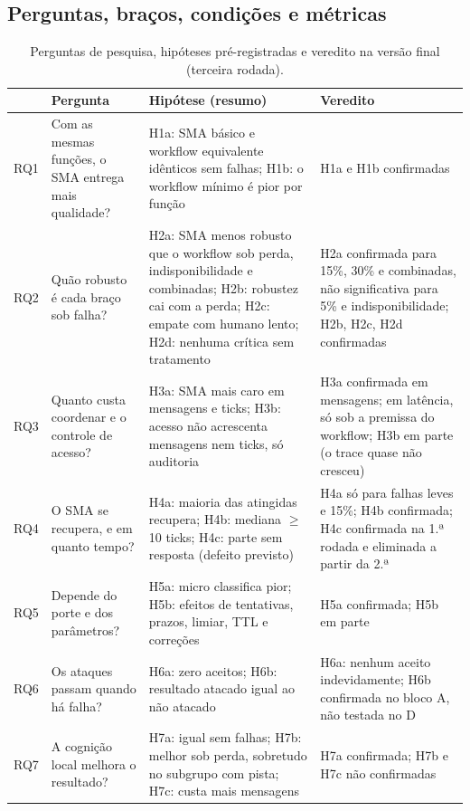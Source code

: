 \documentclass[10pt,a4paper]{article}
\newenvironment{tabela}[1]{\begin{table}[H]\centering\footnotesize\renewcommand{\arraystretch}{1.1}\caption{#1}}{\end{table}}
\begin{document}
\subsection{Perguntas, braços, condições e métricas}
\begin{tabela}{Perguntas de pesquisa, hipóteses pré-registradas e veredito na versão final (terceira rodada).\label{tab:rq}}
\begin{tabularx}{\linewidth}{L{0.7cm} L{4.3cm} Y L{3.4cm}}
\toprule
& \textbf{Pergunta} & \textbf{Hipótese (resumo)} & \textbf{Veredito}\\ \midrule
RQ1 & Com as mesmas funções, o SMA entrega mais qualidade? & H1a: SMA básico e workflow equivalente idênticos sem falhas; H1b: o workflow mínimo é pior por função & H1a e H1b confirmadas \\
RQ2 & Quão robusto é cada braço sob falha? & H2a: SMA menos robusto que o workflow sob perda, indisponibilidade e combinadas; H2b: robustez cai com a perda; H2c: empate com humano lento; H2d: nenhuma crítica sem tratamento & H2a confirmada para 15\%, 30\% e combinadas, não significativa para 5\% e indisponibilidade; H2b, H2c, H2d confirmadas \\
RQ3 & Quanto custa coordenar e o controle de acesso? & H3a: SMA mais caro em mensagens e ticks; H3b: acesso não acrescenta mensagens nem ticks, só auditoria & H3a confirmada em mensagens; em latência, só sob a premissa do workflow; H3b em parte (o trace quase não cresceu) \\
RQ4 & O SMA se recupera, e em quanto tempo? & H4a: maioria das atingidas recupera; H4b: mediana $\geq$ 10 ticks; H4c: parte sem resposta (defeito previsto) & H4a só para falhas leves e 15\%; H4b confirmada; H4c confirmada na 1.ª rodada e eliminada a partir da 2.ª \\
RQ5 & Depende do porte e dos parâmetros? & H5a: micro classifica pior; H5b: efeitos de tentativas, prazos, limiar, TTL e correções & H5a confirmada; H5b em parte \\
RQ6 & Os ataques passam quando há falha? & H6a: zero aceitos; H6b: resultado atacado igual ao não atacado & H6a: nenhum aceito indevidamente; H6b confirmada no bloco A, não testada no D \\
RQ7 & A cognição local melhora o resultado? & H7a: igual sem falhas; H7b: melhor sob perda, sobretudo no subgrupo com pista; H7c: custa mais mensagens & H7a confirmada; H7b e H7c não confirmadas \\
\bottomrule
\end{tabularx}
\end{tabela}
\end{document}
